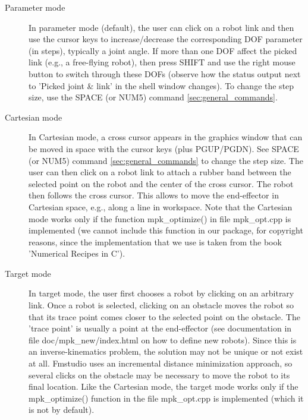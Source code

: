 \documentclass[letter,12pt]{article}
\begin{document}
\begin{description}
  
\item[Parameter mode] In parameter mode (default), the user can click
  on a robot link and then use the cursor keys to increase/decrease
  the corresponding DOF parameter (in steps), typically a joint angle.
  If more than one DOF affect the picked link (e.g., a free-flying
  robot), then press SHIFT and use the right mouse button to switch
  through these DOFs (observe how the status output next to 'Picked
  joint \& link' in the shell window changes).  To change the step
  size, use the SPACE (or NUM5) command \ref{sec:general_commands}.
  
\item[Cartesian mode] In Cartesian mode, a cross cursor appears in the
  graphics window that can be moved in space with the cursor keys
  (plus PGUP/PGDN).  See SPACE (or NUM5) command
  \ref{sec:general_commands} to change the step size.  The user can
  then click on a robot link to attach a rubber band between the
  selected point on the robot and the center of the cross cursor.  The
  robot then follows the cross cursor.  This allows to move the
  end-effector in Cartesian space, e.g., along a line in workspace.
  Note that the Cartesian mode works only if the function
  mpk_optimize() in file mpk_opt.cpp is implemented (we cannot include
  this function in our package, for copyright reasons, since the
  implementation that we use is taken from the book 'Numerical Recipes
  in C').
  
\item[Target mode] In target mode, the user first chooses a robot by
  clicking on an arbitrary link.  Once a robot is selected, clicking
  on an obstacle moves the robot so that its trace point comes closer
  to the selected point on the obstacle.  The 'trace point' is usually
  a point at the end-effector (see documentation in file
  doc/mpk_new/index.html on how to define new robots).  Since this is
  an inverse-kinematics problem, the solution may not be unique or not
  exist at all.  Fmstudio uses an incremental distance minimization
  approach, so several clicks on the obstacle may be necessary to move
  the robot to its final location.  Like the Cartesian mode, the
  target mode works only if the mpk_optimize() function in the file
  mpk_opt.cpp is implemented (which it is not by default).

\end{description}
\end{document}
